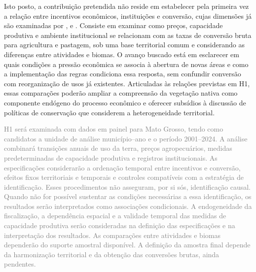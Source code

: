 Isto posto, a contribuição pretendida não reside em estabelecer pela primeira vez a relação entre incentivos econômicos, instituições e conversão, cujas dimensões já são examinadas por ,  e . Consiste em examinar como preços, capacidade produtiva e ambiente institucional se relacionam com as taxas de conversão bruta para agricultura e pastagem, sob uma base territorial comum e considerando as diferenças entre atividades e biomas. O avanço buscado está em esclarecer em quais condições a pressão econômica se associa à abertura de novas áreas e como a implementação das regras condiciona essa resposta, sem confundir conversão com reorganização de usos já existentes. Articuladas às relações previstas em H1, essas comparações poderão ampliar a compreensão da vegetação nativa como componente endógeno do processo econômico e oferecer subsídios à discussão de políticas de conservação que considerem a heterogeneidade territorial.


\textcolor{gray}{H1 será examinada com dados em painel para Mato Grosso, tendo como candidatos a unidade de análise município--ano e o período 2001--2024. A análise combinará transições anuais de uso da terra, preços agropecuários, medidas predeterminadas de capacidade produtiva e registros institucionais. As especificações considerarão a ordenação temporal entre incentivos e conversão, efeitos fixos territoriais e temporais e controles compatíveis com a estratégia de identificação. Esses procedimentos não asseguram, por si sós, identificação causal. Quando não for possível sustentar as condições necessárias a essa identificação, os resultados serão interpretados como associações condicionais. A endogeneidade da fiscalização, a dependência espacial e a validade temporal das medidas de capacidade produtiva serão consideradas na definição das especificações e na interpretação dos resultados. As comparações entre atividades e biomas dependerão do suporte amostral disponível. A definição da amostra final depende da harmonização territorial e da obtenção das conversões brutas, ainda pendentes.}



